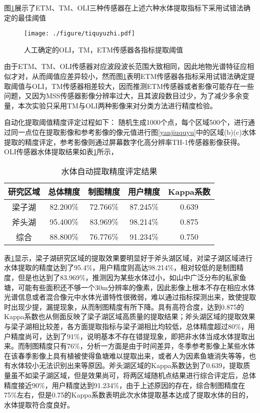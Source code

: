 \documentclass[supercite]{upcthesis}
\begin{document}
图\ref{tiquyuzhi}展示了ETM、TM、OLI三种传感器在上述六种水体提取指标下采用试错法确定的最佳阈值
\begin{figure}[htbp]
	\centering
	\texttt{[image: ./figure/tiquyuzhi.pdf]}
	\caption{人工确定的OLI，TM，ETM传感器各指标提取阈值}
	\label{tiquyuzhi}
\end{figure}
由于ETM、TM、OLI传感器对应波段波长范围大致相同，因此地物光谱特征应相似才对，从而阈值应差异较小，然而图\ref{tiquyuzhi}表明ETM传感器各指标采用试错法确定提取阈值与OLI，TM传感器相差较大，因而推测ETM传感器或者影像可能存在一些问题，又因为MSS传感器影像分辨率过大，且其波段数目过少，为了减少多余变量，本次实验只采用TM与OLI两种影像来对分类方法进行精度检验。

自动化提取阈值精度评定过程如下：
随机生成1000个点，每个区域500个，进行通过同一点位在提取影像和参考影像的像元值进行图\ref{yanjiuquyu}中的区域(b)(c)水体提取的精度评定，参考影像则通过屏幕数字化高分辨率TH-1传感器影像获得。OLI传感器水体提取结果如表\ref{tiqu_jindu}所示，
\begin{table}[htbp]
	\small
	\centering
	\caption{水体自动提取精度评定结果}
	\begin{tabular}{ccccc}
		\toprule
		研究区域 	& 总体精度 & 制图精度 & 用户精度 	& Kappa系数 \\ \midrule
		梁子湖	&82.200\%   &   72.766\%     &  87.245\%  & 0.639\\
		斧头湖	&95.400\%	&83.969\%	&98.214\%	&0.875\\
		综合		&88.800\%	&76.776\%	&91.234\%	&0.750\\ \bottomrule
	\end{tabular}
	\label{tiqu_jindu}
\end{table}
表\ref{tiqu_jindu}显示，梁子湖研究区域的提取效果要明显好于斧头湖区域，对梁子湖区域进行水体提取的精度达到了95.4\%，用户精度则高达98.214\%，相对较低的是制图精度，但是也达到了83.969\%，推测因为某些水体过小，如山中广泛分布的私家鱼塘，可能有些面积还不够一个30m分辨率的像素，因此影像上根本不存在相应水体光谱信息或者混合像元中水体光谱特性很微弱，难以通过指标探测出来，致使提取时出现少提，漏提现象，从而制图精度有所下降。具有高符合度，达到0.875的Kappa系数也从侧面反映了梁子湖区域高质量的提取结果；斧头湖区域的提取效果与梁子湖相比较差，各方面提取指标与梁子湖相比均较低，总体精度超过80\%，用户精度尚可，达到了91\%，说明基本不存在错提现象，即把非水体当成水体提取出来。而制图精度只有76\%，分析一方面是由于时间差异，冬季参考影像上某些水体在该春季影像上具有植被使得鱼塘难以提取出来，或者人为因素鱼塘消失等等，也有水体较小无法识别出来等原因。斧头湖区域的Kappa系数达到了0.639，提取质量虽不如梁子湖区域，但是效果尚可，将两区域随机点结果进行综合评定后，总体精度接近90\%，用户精度达到91.234\%，由于上述原因的存在，综合制图精度在75\%左右，但是0.75的Kappa系数表明此次水体提取基本达成了提取水体的目的，水体提取符合度良好。
\end{document}
